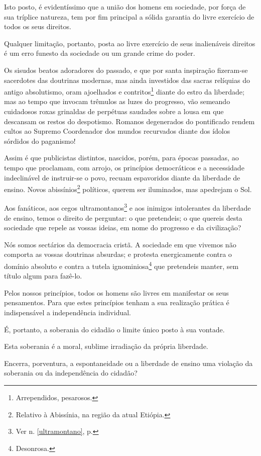 Isto posto, é evidentíssimo que a união dos homens em sociedade, por
força de sua tríplice natureza, tem por fim principal a sólida garantia
do livre exercício de todos os seus direitos.

Qualquer limitação, portanto, posta ao livre exercício de seus
inalienáveis direitos é um erro funesto da sociedade ou um grande crime
do poder.

Os sisudos beatos adoradores do passado, e que por santa inspiração
fizeram-se sacerdotes das doutrinas modernas, mas ainda investidos das
sacras relíquias do antigo absolutismo, oram ajoelhados e
contritos\footnote{Arrependidos, pesarosos.} diante do estro da
liberdade; mas ao tempo que invocam trêmulos as luzes do progresso, vão
semeando cuidadosos roxas grinaldas de perpétuas saudades sobre a lousa
em que descansam os restos do despotismo. Romanos degenerados do
pontificado rendem cultos ao Supremo Coordenador dos mundos recurvados
diante dos ídolos sórdidos do paganismo!

Assim é que publicistas distintos, nascidos, porém, para épocas
passadas, ao tempo que proclamam, com arrojo, os princípios democráticos
e a necessidade indeclinável de instruir-se o povo, recuam espavoridos
diante da liberdade de ensino. Novos abissínios\footnote{Relativo à
  Abissínia, na região da atual Etiópia.} políticos, querem ser
iluminados, mas apedrejam o Sol.

Aos fanáticos, aos cegos ultramontanos\footnote{Ver n. \ref{ultramontano}, 
p. \pageref{ultramontano}} e aos inimigos intolerantes da liberdade de ensino,
temos o direito de perguntar: o que pretendeis; o que quereis desta
sociedade que repele as vossas ideias, em nome do progresso e da
civilização?

Nós somos sectários da democracia cristã. A sociedade em que vivemos não
comporta as vossas doutrinas absurdas; e protesta energicamente contra o
domínio absoluto e contra a tutela ignominiosa\footnote{Desonrosa.}
que pretendeis manter, sem título algum para fazê-lo.

Pelos nossos princípios, todos os homens são livres em manifestar os
seus pensamentos. Para que estes princípios tenham a sua realização
prática é indispensável a independência individual.

É, portanto, a soberania do cidadão o limite único posto à sua vontade.

Esta soberania é a moral, sublime irradiação da própria liberdade.

Encerra, porventura, a espontaneidade ou a liberdade de ensino uma
violação da soberania ou da independência do cidadão?

